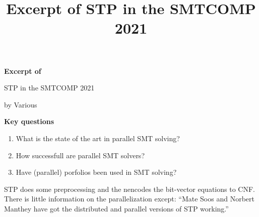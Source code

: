 \documentclass{scrartcl}
\title{Excerpt of STP in the SMTCOMP 2021}
\begin{document}
\begin{center}
    \Large{\textbf{Excerpt of}}

    \LARGE{STP in the SMTCOMP 2021}

    \large{by Various}
\end{center}

\vspace{1cm}

\begin{addmargin}[0.2\linewidth]{0.2\linewidth}
    \begin{center}
        \textbf{Key questions}
    \end{center}
    \begin{enumerate}[i]
        \item What is the state of the art in parallel SMT solving?
        \item How successfull are parallel SMT solvers?
        \item Have (parallel) porfolios been used in SMT solving?
    \end{enumerate}
\end{addmargin}

\vspace{1cm}
STP does some preprocessing and the nencodes the bit-vector equations to CNF.
There is little information on the parallelization except:
\enquote{Mate Soos and Norbert Manthey have got the distributed and parallel versions of
STP working.}
\end{document}
